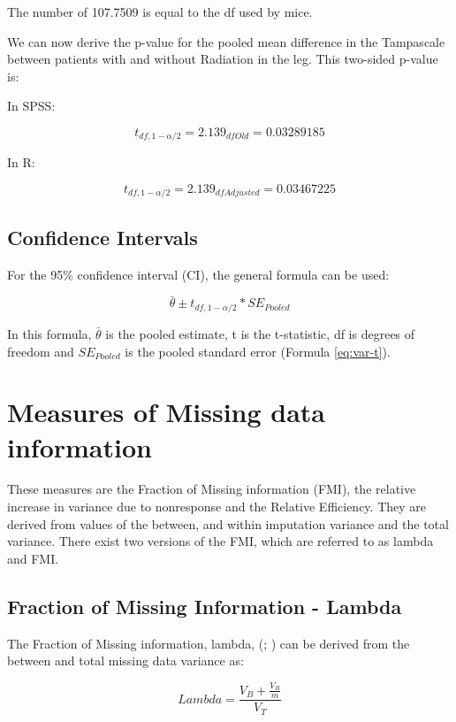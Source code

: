 \documentclass[]{book}
\begin{document}
The number of 107.7509 is equal to the df used by mice.

We can now derive the p-value for the pooled mean difference in the
Tampascale between patients with and without Radiation in the leg. This
two-sided p-value is:

In SPSS:

\[t_{df,1-\alpha/2}=2.139_{df{Old}}=0.03289185\]

In R:

\[t_{df,1-\alpha/2}=2.139_{df{Adjusted}}=0.03467225\]

\section{Confidence Intervals}\label{confidence-intervals}

For the 95\% confidence interval (CI), the general formula can be used:

\begin{equation}
\bar{\theta} ± t_{df,1-\alpha/2} * SE_{Pooled}
  \label{eq:conf}
\end{equation}

In this formula, \(\bar{\theta}\) is the pooled estimate, t is the
t-statistic, df is degrees of freedom and \(SE_{Pooled}\) is the pooled
standard error (Formula \eqref{eq:var-t}).

\chapter{Measures of Missing data
information}\label{measures-of-missing-data-information}

These measures are the Fraction of Missing information (FMI), the
relative increase in variance due to nonresponse and the Relative
Efficiency. They are derived from values of the between, and within
imputation variance and the total variance. There exist two versions of
the FMI, which are referred to as lambda and FMI.

\section{Fraction of Missing Information -
Lambda}\label{fraction-of-missing-information---lambda}

The Fraction of Missing information, lambda, (\citet{VanBuuren2018};
\citet{raghunathan2016}) can be derived from the between and total
missing data variance as:

\begin{equation}
Lambda = \frac{V_B + \frac{V_B}{m}}{V_T}
  \label{eq:lambda}
\end{equation}
\end{document}
